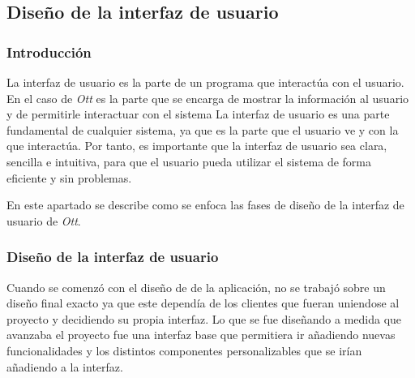 \subsection{Diseño de la interfaz de usuario}
\label{sec:diseno-ux}

\subsubsection{Introducción}
\label{sec:diseno-ux-introduccion}

La interfaz de usuario es la parte de un programa que interactúa con el usuario. En el caso de \textit{Ott} 
es la parte que se encarga de mostrar la información al usuario y de permitirle interactuar con el sistema
La interfaz de usuario es una parte fundamental de cualquier sistema, ya que es la parte que el usuario ve 
y con la que interactúa. Por tanto, es importante que la interfaz de usuario sea clara, sencilla e intuitiva, 
para que el usuario pueda utilizar el sistema de forma eficiente y sin problemas.

En este apartado se describe como se enfoca las fases de diseño de la interfaz de usuario de \textit{Ott}.

\subsubsection{Diseño de la interfaz de usuario}
\label{sec:diseno-ux-diseno}

Cuando se comenzó con el diseño de de la aplicación, no se trabajó sobre un diseño final exacto ya que este
dependía de los clientes que fueran uniendose al proyecto y decidiendo su propia interfaz. Lo que se fue diseñando
a medida que avanzaba el proyecto fue una interfaz base que permitiera ir añadiendo nuevas funcionalidades y 
los distintos componentes personalizables que se irían añadiendo a la interfaz. 

